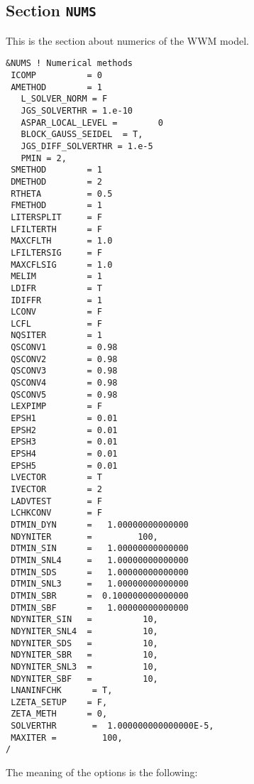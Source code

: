 \documentclass[12pt]{amsart}
\begin{document}
\newpage

\subsection{Section {\tt NUMS}}
This is the section about numerics of the WWM model.

\begin{verbatim}
&NUMS ! Numerical methods
 ICOMP          = 0
 AMETHOD        = 1
   L_SOLVER_NORM = F   
   JGS_SOLVERTHR = 1.e-10
   ASPAR_LOCAL_LEVEL =        0
   BLOCK_GAUSS_SEIDEL  = T,
   JGS_DIFF_SOLVERTHR = 1.e-5
   PMIN = 2,
 SMETHOD        = 1
 DMETHOD        = 2
 RTHETA         = 0.5  
 FMETHOD        = 1
 LITERSPLIT     = F
 LFILTERTH      = F
 MAXCFLTH       = 1.0 
 LFILTERSIG     = F
 MAXCFLSIG      = 1.0
 MELIM          = 1
 LDIFR          = T
 IDIFFR         = 1
 LCONV          = F
 LCFL           = F
 NQSITER        = 1
 QSCONV1        = 0.98
 QSCONV2        = 0.98
 QSCONV3        = 0.98
 QSCONV4        = 0.98
 QSCONV5        = 0.98
 LEXPIMP        = F
 EPSH1          = 0.01
 EPSH2          = 0.01
 EPSH3          = 0.01
 EPSH4          = 0.01
 EPSH5          = 0.01
 LVECTOR        = T
 IVECTOR        = 2
 LADVTEST       = F
 LCHKCONV       = F
 DTMIN_DYN      =   1.00000000000000
 NDYNITER       =         100,
 DTMIN_SIN      =   1.00000000000000
 DTMIN_SNL4     =   1.00000000000000 
 DTMIN_SDS      =   1.00000000000000
 DTMIN_SNL3     =   1.00000000000000
 DTMIN_SBR      =  0.100000000000000
 DTMIN_SBF      =   1.00000000000000
 NDYNITER_SIN   =          10,
 NDYNITER_SNL4  =          10,
 NDYNITER_SDS   =          10,
 NDYNITER_SBR   =          10,
 NDYNITER_SNL3  =          10,
 NDYNITER_SBF   =          10,
 LNANINFCHK      = T,
 LZETA_SETUP    = F,
 ZETA_METH      = 0,
 SOLVERTHR       =  1.000000000000000E-5,
 MAXITER =         100,
/
\end{verbatim}
The meaning of the options is the following:
\end{document}
